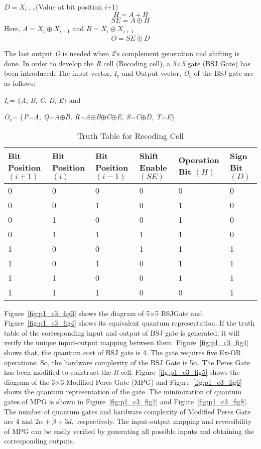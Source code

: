 $D=X_{i+1} $(Value at bit position \textit{i}+1)
\[H=A+B\] 
\[SE=A\oplus H\] 
Here, $A=X_{i} \oplus X_{i-1} $ and $B=X_{i} \oplus X_{i+1} $
\[O=\overline{SE\oplus D}\] 

The last output \textit{O} is needed when \textit{2}'s complement generation and shifting is done. In order to develop the \textit{R} cell (Recoding cell), a \textit{5$\times $5} gate (BSJ Gate) has been introduced. The input vector, \textit{I${}_{v}$} and Output vector, \textit{O${}_{v}$} of the BSJ gate are as follows:
\begin{center}
\textit{ I${}_{v}$}= $\mathrm{\{}$\textit{A}, \textit{B}, \textit{C}, \textit{D}, \textit{E}$\mathrm{\}}$ and 

\textit{O${}_{v}$}= $\mathrm{\{}$\textit{P=A, Q=A$\oplus$B, R=A$\oplus$B$\oplus$C$\oplus$E, S=C$\oplus$D, T=E}$\mathrm{\}}$
\end{center}

\begin{table}[!h]
	\centering
	\caption{Truth Table for Recoding Cell}
	\label{tab:p1_c3_tab2}
	\begin{tabular}{p{0.4in}p{0.4in}p{0.4in}p{0.4in}p{0.5in}p{0.4in}} \hline 
		Bit  Position $(i+1)$ & Bit Position $(i)$ & Bit Position  $(i-1)$ & Shift Enable $(SE)$ & Operation Bit $(H)$ & Sign Bit $(D)$ \\ \hline 
		0 & 0 & 0 & 0 & 0 & 0 \\ 
		0 & 0 & 1 & 0 & 1 & 0 \\ 
		0 & 1 & 0 & 0 & 1 & 0 \\ 
		0 & 1 & 1 & 1 & 1 & 0 \\ 
		1 & 0 & 0 & 1 & 1 & 1 \\ 
		1 & 0 & 1 & 0 & 1 & 1 \\ 
		1 & 1 & 0 & 0 & 1 & 1 \\ 
		1 & 1 & 1 & 0 & 0 & 1 \\ \hline 
	\end{tabular}
\end{table}

Figure~\ref{fig:p1_c3_fig3} shows the diagram of {5$\times $5} BSJGate and Figure~\ref{fig:p1_c3_fig4} shows its equivalent quantum representation. If the truth table of the corresponding input and output of BSJ gate is generated, it will verify the unique input-output mapping between them. Figure~\ref{fig:p1_c3_fig4} shows that, the quantum cost of BSJ gate is {4}. The gate requires five Ex-OR operations. So, the hardware complexity of the BSJ Gate is {5$\alpha$.} The Peres Gate has been modified to construct the \textit{R} cell. Figure~\ref{fig:p1_c3_fig5} shows the diagram of the {3$\times $3} Modified Peres Gate (MPG) and Figure~\ref{fig:p1_c3_fig6} shows the quantum representation of the gate. The minimization of quantum gates of MPG is shown in Figure~\ref{fig:p1_c3_fig7} and Figure~\ref{fig:p1_c3_fig8}. The number of quantum gates and hardware complexity of Modified Peres Gate are {4} and $2\alpha+\beta +3d,$ respectively. The input-output mapping and reversibility of MPG can be easily verified by generating all possible inputs and obtaining the corresponding outputs.


